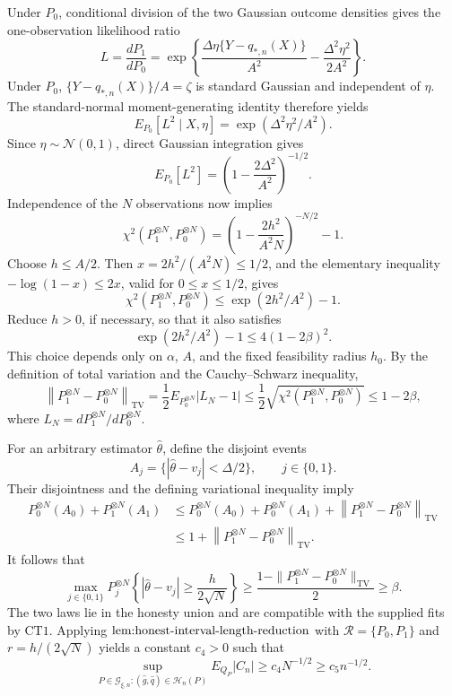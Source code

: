 Under \(P_0\), conditional division of the two Gaussian outcome densities gives the one-observation likelihood ratio
\[
 L=\frac{dP_1}{dP_0}
 =\exp\!\left\{
 \frac{\Delta\eta\{Y-q_{*,n}(X)\}}{A^2}
 -\frac{\Delta^2\eta^2}{2A^2}
 \right\}.
\]
Under \(P_0\), \(\{Y-q_{*,n}(X)\}/A=\zeta\) is standard Gaussian and independent of \(\eta\).  The standard-normal moment-generating identity therefore yields
\[
 E_{P_0}[L^2\mid X,\eta]
 =\exp(\Delta^2\eta^2/A^2).
\]
Since \(\eta\sim\mathcal N(0,1)\), direct Gaussian integration gives
\[
 E_{P_0}[L^2]
 =\left(1-\frac{2\Delta^2}{A^2}\right)^{-1/2}.
\]
Independence of the \(N\) observations now implies
\[
 \chi^2\!\left(P_1^{\otimes N},P_0^{\otimes N}\right)
 =\left(1-\frac{2h^2}{A^2N}\right)^{-N/2}-1.
\]
Choose \(h\le A/2\).  Then \(x=2h^2/(A^2N)\le1/2\), and the elementary inequality \(-\log(1-x)\le2x\), valid for \(0\le x\le1/2\), gives
\[
 \chi^2\!\left(P_1^{\otimes N},P_0^{\otimes N}\right)
 \le \exp(2h^2/A^2)-1.
\]
Reduce \(h>0\), if necessary, so that it also satisfies
\[
 \exp(2h^2/A^2)-1\le4(1-2\beta)^2.
\]
This choice depends only on \(\alpha\), \(A\), and the fixed feasibility radius \(h_0\).  By the definition of total variation and the Cauchy--Schwarz inequality,
\[
 \left\|P_1^{\otimes N}-P_0^{\otimes N}\right\|_{\mathrm{TV}}
 =\frac12E_{P_0^{\otimes N}}|L_N-1|
 \le\frac12\sqrt{\chi^2(P_1^{\otimes N},P_0^{\otimes N})}
 \le1-2\beta,
\]
where \(L_N=dP_1^{\otimes N}/dP_0^{\otimes N}\).

For an arbitrary estimator \(\widehat\theta\), define the disjoint events
\[
 A_j=\{|\widehat\theta-v_j|<\Delta/2\},
 \qquad j\in\{0,1\}.
\]
Their disjointness and the defining variational inequality imply
\[
 \begin{aligned}
 P_0^{\otimes N}(A_0)+P_1^{\otimes N}(A_1)
 &\le P_0^{\otimes N}(A_0)+P_0^{\otimes N}(A_1)
   +\left\|P_1^{\otimes N}-P_0^{\otimes N}\right\|_{\mathrm{TV}}\\
 &\le1+\left\|P_1^{\otimes N}-P_0^{\otimes N}\right\|_{\mathrm{TV}}.
 \end{aligned}
\]
It follows that
\[
 \max_{j\in\{0,1\}}
 P_j^{\otimes N}\!\left\{
 |\widehat\theta-v_j|\ge\frac{h}{2\sqrt N}
 \right\}
 \ge\frac{1-\|P_1^{\otimes N}-P_0^{\otimes N}\|_{\mathrm{TV}}}{2}
 \ge\beta.
\]
The two laws lie in the honesty union and are compatible with the supplied fits by \(\mathrm{CT1}\).  Applying \(\textup{lem:honest-interval-length-reduction}\) with \(\mathscr R=\{P_0,P_1\}\) and \(r=h/(2\sqrt N)\) yields a constant \(c_4>0\) such that
\[
 \sup_{P\in\mathcal G_{\xi,n}:(\widehat g,\widehat q)\in\mathcal H_n(P)}
 E_{Q_P}|C_n|
 \ge c_4N^{-1/2}
 \ge c_5n^{-1/2}.
\]

